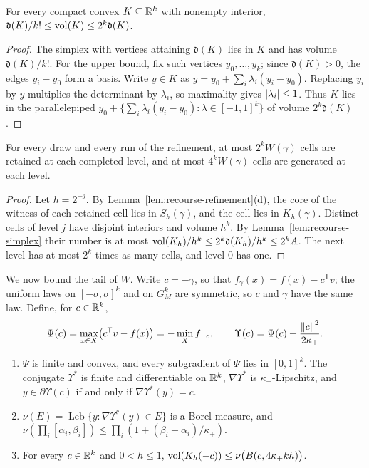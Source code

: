 \begin{lemma}
\label{lem:recourse-simplex}
For every compact convex $K\subseteq\mathbb R^k$ with nonempty interior,
$\mathfrak d(K)/k!\le\operatorname{vol}(K)\le2^k\mathfrak d(K)$.
\end{lemma}

\begin{proof}
The simplex with vertices attaining $\mathfrak d(K)$ lies in $K$ and has
volume $\mathfrak d(K)/k!$. For the upper bound, fix such vertices
$y_0,\ldots,y_k$; since $\mathfrak d(K)>0$, the edges $y_i-y_0$ form a
basis. Write $y\in K$ as $y=y_0+\sum_i\lambda_i(y_i-y_0)$. Replacing
$y_i$ by $y$ multiplies the determinant by $\lambda_i$, so maximality
gives $\left\lvert\lambda_i\right\rvert\le1$. Thus $K$ lies in the parallelepiped
$y_0+\{\sum_i\lambda_i(y_i-y_0):\lambda\in[-1,1]^k\}$ of volume
$2^k\mathfrak d(K)$.
\end{proof}

\begin{lemma}
\label{lem:recourse-cell-count}
For every draw and every run of the refinement, at most $2^kW(\gamma)$
cells are retained at each completed level, and at most $4^kW(\gamma)$
cells are generated at each level.
\end{lemma}

\begin{proof}
Let $h=2^{-j}$. By Lemma~\ref{lem:recourse-refinement}(d), the core of
the witness of each retained cell lies in $S_h(\gamma)$, and the cell
lies in $K_h(\gamma)$. Distinct cells of level $j$ have disjoint
interiors and volume $h^k$. By Lemma~\ref{lem:recourse-simplex} their
number is at most $\operatorname{vol}(K_h)/h^k\le2^k\mathfrak d(K_h)/h^k\le2^kA$. The
next level has at most $2^k$ times as many cells, and level $0$ has one.
\end{proof}

We now bound the tail of $W$. Write $c=-\gamma$, so that
$f_\gamma(x)=f(x)-c^{\mathsf T}v$; the uniform laws on
$[-\sigma,\sigma]^k$ and on $G_M^k$ are symmetric, so $c$ and $\gamma$
have the same law. Define, for $c\in\mathbb R^k$,
\[
 \Psi(c)=\max_{x\in X}\bigl(c^{\mathsf T}v-f(x)\bigr)
 =-\min_X f_{-c},\qquad
 \Upsilon(c)=\Psi(c)+\frac{\left\lVert c\right\rVert^2}{2\kappa_+}.
\]

\begin{lemma}
\label{lem:recourse-conjugate}
\begin{enumerate}[label=(\alph*)]
\item $\Psi$ is finite and convex, and every subgradient of $\Psi$ lies
in $[0,1]^k$. The conjugate $\Upsilon^*$ is finite and differentiable
on $\mathbb R^k$, $\nabla\Upsilon^*$ is $\kappa_+$-Lipschitz, and
$y\in\partial\Upsilon(c)$ if and only if $\nabla\Upsilon^*(y)=c$.
\item $\nu(E)=\operatorname{Leb}\{y:\nabla\Upsilon^*(y)\in E\}$ is a Borel
measure, and $\nu(\prod_i[\alpha_i,\beta_i])\le
\prod_i(1+(\beta_i-\alpha_i)/\kappa_+)$.
\item For every $c\in\mathbb R^k$ and $0<h\le1$,
$\operatorname{vol}(K_h(-c))\le\nu\bigl(B(c,4\kappa_+kh)\bigr)$.
\end{enumerate}
\end{lemma}

